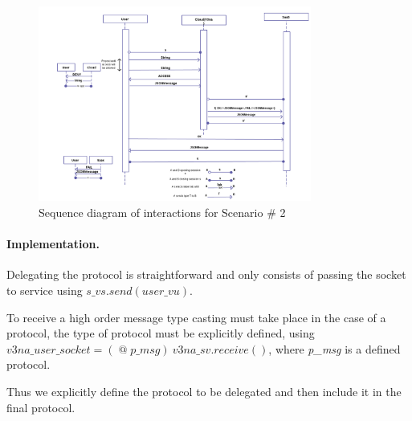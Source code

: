 \documentclass[10pt]{llncs}
\begin{document}
\begin{figure}
\centering
\includegraphics[width=0.8\textwidth]{resources/interaction-sc2.png}
\caption{Sequence diagram of interactions for Scenario \# 2}
\label{fig:seq-diagram-sc2}
\end{figure}

\paragraph{Implementation.} %
Delegating the protocol is straightforward and only consists of passing the socket to service using $\textit{s\_vs}.\textit{send}(\textit{user\_vu})$.

To receive a high order message type casting must take place in the case of a protocol, the type of protocol must be explicitly defined, using $\textit{v3na\_user\_socket} = \left(\mathopen{@}\textit{p\_msg}\right)~\textit{v3na\_sv}.\textit{receive}()$, where \textit{p\_msg} is a defined protocol.

Thus we explicitly define the protocol to be delegated and then include it in the final protocol.
\end{document}
